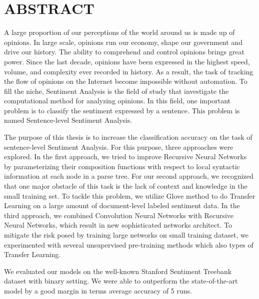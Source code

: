 \chapter*{ABSTRACT}
\label{tomtat}

A large proportion of our perceptions of the world around us is made up of opinions.
In large scale, opinions run our economy, shape our government and drive our history. 
The ability to comprehend and control opinions brings great power.
Since the last decade, opinions have been expressed in the highest speed, volume, and complexity ever recorded in history.
As a result, the task of tracking the flow of opinions on the Internet become impossible without automation.  
To fill the niche, Sentiment Analysis is the field of study that investigate the computational method for analyzing opinions.
In this field, one important problem is to classify the sentiment expressed by a sentence.
This problem is named Sentence-level Sentiment Analysis.

The purpose of this thesis is to increase the classification accuracy on the task of sentence-level Sentiment Analysis.
For this purpose, three approaches were explored.
In the first approach, we tried to improve Recursive Neural Networks by parameterizing their composition functions with respect to local syntactic information at each node in a parse tree.
For our second approach, we recognized that one major obstacle of this task is the lack of context and knowledge in the small training set.
To tackle this problem, we utilize Glove method to do Transfer Learning on a large amount of document-level labeled sentiment data.
In the third approach, we combined Convolution Neural Networks with Recursive Neural Networks, which result in new sophisticated networks architect. 
To mitigate the risk posed by training large networks on small training dataset, we experimented with several unsupervised pre-training methods which also types of Transfer Learning.

We evaluated our models on the well-known Stanford Sentiment Treebank dataset with binary setting. 
We were able to outperform the state-of-the-art model by a good margin in terms average accuracy of 5 runs.